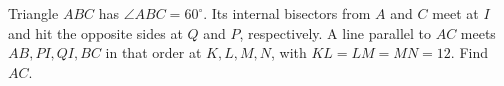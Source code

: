 Triangle $ABC$ has $\angle ABC=60^\circ$. Its internal bisectors from $A$ and $C$ meet at $I$ and hit the opposite sides at $Q$ and $P$, respectively. A line parallel to $AC$ meets $AB,PI,QI,BC$ in that order at $K,L,M,N$, with $KL=LM=MN=12$. Find $AC$.
